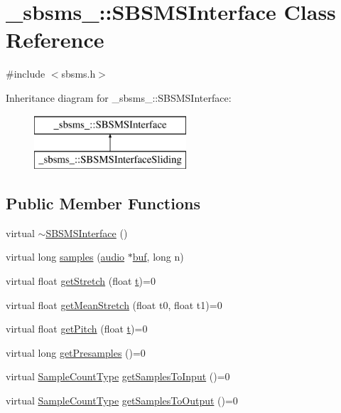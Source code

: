 \hypertarget{class__sbsms___1_1_s_b_s_m_s_interface}{}\section{\+\_\+sbsms\+\_\+\+:\+:S\+B\+S\+M\+S\+Interface Class Reference}
\label{class__sbsms___1_1_s_b_s_m_s_interface}


{\ttfamily \#include $<$sbsms.\+h$>$}

Inheritance diagram for \+\_\+sbsms\+\_\+\+:\+:S\+B\+S\+M\+S\+Interface\+:\begin{figure}[H]
\begin{center}
\leavevmode
\includegraphics[height=2.000000cm]{class__sbsms___1_1_s_b_s_m_s_interface}
\end{center}
\end{figure}
\subsection*{Public Member Functions}
\begin{DoxyCompactItemize}
\item 
virtual \hyperlink{class__sbsms___1_1_s_b_s_m_s_interface_ac811f41808c76a359a68f1b276b0c20e}{$\sim$\+S\+B\+S\+M\+S\+Interface} ()
\item 
virtual long \hyperlink{class__sbsms___1_1_s_b_s_m_s_interface_a2c8362811e0d86bb2a1c3b8b406c9ff0}{samples} (\hyperlink{namespace__sbsms___a11786cc5bd221ff534972ae350477324}{audio} $\ast$\hyperlink{xlstr_8c_a781718f5b53a876fe91c424c4607fa8f}{buf}, long n)
\item 
virtual float \hyperlink{class__sbsms___1_1_s_b_s_m_s_interface_a748ffe74692f9ac13d09a2611003341f}{get\+Stretch} (float \hyperlink{octave__test_8m_aaccc9105df5383111407fd5b41255e23}{t})=0
\item 
virtual float \hyperlink{class__sbsms___1_1_s_b_s_m_s_interface_a99bfddb899d703e0857a0cdd1f7a9dc4}{get\+Mean\+Stretch} (float t0, float t1)=0
\item 
virtual float \hyperlink{class__sbsms___1_1_s_b_s_m_s_interface_a315b64a91d53a7252d6fe9d78a8fdc9d}{get\+Pitch} (float \hyperlink{octave__test_8m_aaccc9105df5383111407fd5b41255e23}{t})=0
\item 
virtual long \hyperlink{class__sbsms___1_1_s_b_s_m_s_interface_a0c562e54a09662a63117e5aff320f003}{get\+Presamples} ()=0
\item 
virtual \hyperlink{namespace__sbsms___ae4ba47977e7e07f5945e529e2256b662}{Sample\+Count\+Type} \hyperlink{class__sbsms___1_1_s_b_s_m_s_interface_ac7b8d819867ad66c75297b3f33f39a2f}{get\+Samples\+To\+Input} ()=0
\item 
virtual \hyperlink{namespace__sbsms___ae4ba47977e7e07f5945e529e2256b662}{Sample\+Count\+Type} \hyperlink{class__sbsms___1_1_s_b_s_m_s_interface_af413fd297a596ccc14225d61cf6501a0}{get\+Samples\+To\+Output} ()=0
\end{DoxyCompactItemize}


